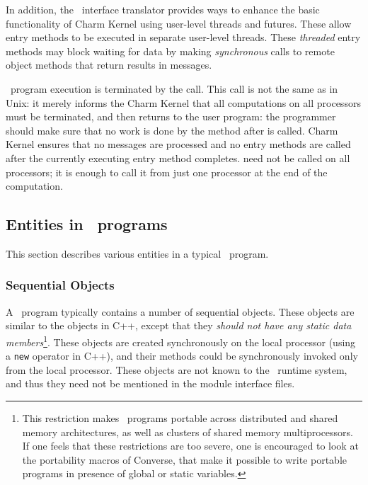 In addition, the \charmpp\ interface translator provides ways to enhance the
basic functionality of Charm Kernel using user-level threads and futures. These
allow entry methods to be executed in separate user-level threads.  These
 {\em threaded} entry methods may block waiting for data by
making {\em synchronous} calls to remote object methods that return results in
messages.

\charmpp\ program execution is terminated by the 
 call. This call is not the same as in Unix:
it merely informs the Charm Kernel that all computations on all processors must
be terminated, and then returns to the user program: the programmer should make
sure that no work is done by the method after  is called.
Charm Kernel ensures that no messages are processed and no entry methods are
called after the currently executing entry method completes. 
need not be called on all processors; it is enough to call it from just one
processor at the end of the computation.

\subsection{Entities in \charmpp\ programs}

This section describes various entities in a typical \charmpp\ program.

\subsubsection{Sequential Objects}

A \charmpp\ program typically contains a number of sequential objects. These
objects are similar to the objects in C++, except that they {\em should not
have any static data members}\footnote{ This restriction makes \charmpp\
programs portable across distributed and shared memory architectures, as well
as clusters of shared memory multiprocessors. If one feels that these
restrictions are too severe, one is encouraged to look at the portability
macros of Converse, that make it possible to write portable programs in
presence of global or static variables.  }. These objects are created
synchronously on the local processor (using a {\tt new} operator in C++), and
their methods could be synchronously invoked only from the local processor.
These objects are not known to the \charmpp\ runtime system, and
thus they need not be mentioned in the module interface files.

